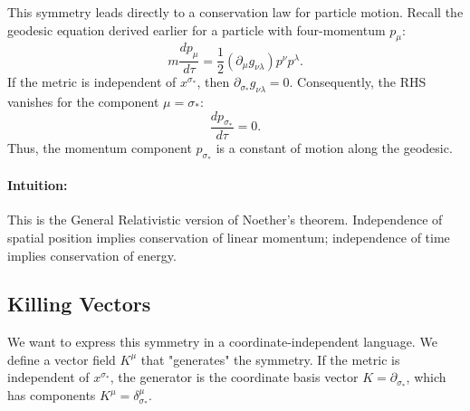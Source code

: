 \documentclass[11pt, a4paper]{report}
\begin{document}
This symmetry leads directly to a conservation law for particle motion. Recall the geodesic equation derived earlier for a particle with four-momentum \(p_\mu\):
\begin{equation}
m \frac{dp_\mu}{d\tau} = \frac{1}{2} (\partial_\mu g_{\nu\lambda}) p^\nu p^\lambda.
\end{equation}
If the metric is independent of \(x^{\sigma_*}\), then \(\partial_{\sigma_*} g_{\nu\lambda} = 0\). Consequently, the RHS vanishes for the component \(\mu = \sigma_*\):
\begin{equation}
\frac{dp_{\sigma_*}}{d\tau} = 0.
\end{equation}
Thus, the momentum component \(p_{\sigma_*}\) is a constant of motion along the geodesic.

\paragraph{Intuition:} This is the General Relativistic version of Noether's theorem. Independence of spatial position implies conservation of linear momentum; independence of time implies conservation of energy.

\subsection*{Killing Vectors}
We want to express this symmetry in a coordinate-independent language. We define a vector field \(K^\mu\) that "generates" the symmetry. If the metric is independent of \(x^{\sigma_*}\), the generator is the coordinate basis vector \(K = \partial_{\sigma_*}\), which has components \(K^\mu = \delta^\mu_{\sigma_*}\).
\end{document}
